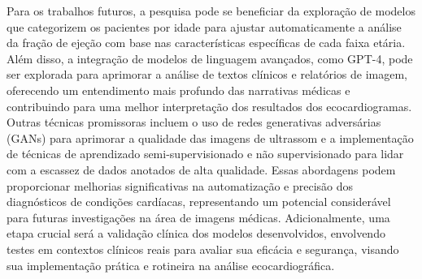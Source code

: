 Para os trabalhos futuros, a pesquisa pode se beneficiar da exploração de modelos que categorizem os pacientes por idade para ajustar automaticamente a análise da fração de ejeção com base nas características específicas de cada faixa etária. Além disso, a integração de modelos de linguagem avançados, como GPT-4, pode ser explorada para aprimorar a análise de textos clínicos e relatórios de imagem, oferecendo um entendimento mais profundo das narrativas médicas e contribuindo para uma melhor interpretação dos resultados dos ecocardiogramas. Outras técnicas promissoras incluem o uso de redes generativas adversárias (GANs) para aprimorar a qualidade das imagens de ultrassom e a implementação de técnicas de aprendizado semi-supervisionado e não supervisionado para lidar com a escassez de dados anotados de alta qualidade. Essas abordagens podem proporcionar melhorias significativas na automatização e precisão dos diagnósticos de condições cardíacas, representando um potencial considerável para futuras investigações na área de imagens médicas. Adicionalmente, uma etapa crucial será a validação clínica dos modelos desenvolvidos, envolvendo testes em contextos clínicos reais para avaliar sua eficácia e segurança, visando sua implementação prática e rotineira na análise ecocardiográfica.